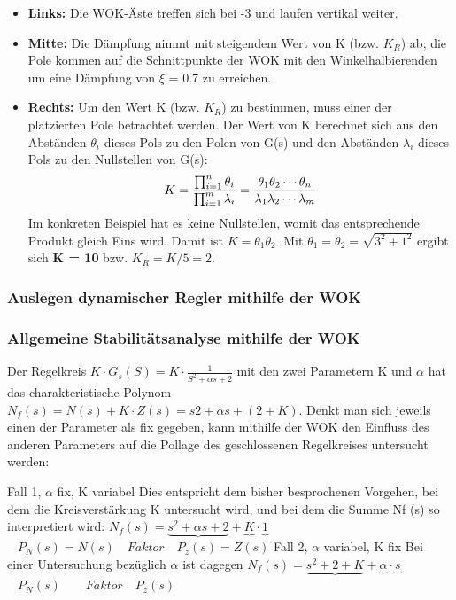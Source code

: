 \begin{multicols}{2}
    \begin{itemize}
    	\item  \textbf{Links:} Die WOK-Äste treffen sich bei -3 und laufen vertikal weiter.
    	\item  \textbf{Mitte:} Die Dämpfung nimmt mit steigendem Wert von K (bzw. $K_R$) ab; die
    	Pole kommen auf die Schnittpunkte der WOK mit den Winkelhalbierenden um eine Dämpfung von $\xi$ = 0.7 zu erreichen.
    	\item  \textbf{Rechts:} Um den Wert K (bzw. $K_R$) zu bestimmen, muss einer der platzierten	Pole betrachtet werden. Der Wert von K berechnet sich aus den Abständen $\theta_i$ dieses Pols zu den Polen von G(s) und den Abständen $\lambda_i$ dieses Pols zu den
    	Nullstellen von G(s): 
        \[
            K=\frac{\prod_{i=1}^{n} \theta_i}{\prod_{i=1}^{m}\lambda_i}=\frac{\theta_1\theta_2\cdots\theta_n}{\lambda_1\lambda_2\cdots\lambda_m} \\
        \]
        Im konkreten Beispiel hat es keine Nullstellen, womit das entsprechende Produkt
    	gleich Eins wird. 	Damit ist $K=\theta_1\theta_2$ .Mit $\theta_1=\theta_2=\sqrt{3^2+1^2}$ ergibt sich \textbf{K = 10} bzw. $K_R = K/5 = 2$.
    \end{itemize}
\end{multicols}


\subsubsection{Auslegen dynamischer Regler mithilfe der WOK }


\subsubsection{Allgemeine Stabilitätsanalyse mithilfe der WOK }
Der Regelkreis $K\cdot G_s(S)=K\cdot\frac{1}{S^2+\alpha s + 2}$ mit den zwei Parametern K und $\alpha$ hat das charakteristische
Polynom $N_f(s)=N(s) + K\cdot Z(s) = s2 + \alpha s + (2 + K)$. Denkt man sich jeweils einen der
Parameter als fix gegeben, kann mithilfe der WOK den Einfluss des anderen Parameters
auf die Pollage des geschlossenen Regelkreises untersucht werden:

Fall 1, $\alpha$ fix, K variabel
Dies entspricht dem bisher besprochenen Vorgehen, bei dem die Kreisverstärkung
K untersucht wird, und bei dem die Summe Nf (s) so interpretiert wird:
$N_f(s)=\underbrace{s^2+\alpha s + 2} +\underbrace{K}\cdot\underbrace{1} $\\
\textcolor{white}{x} \hspace{12.25cm} $P_N(s)=N(s) \quad Faktor  \quad P_z(s)=Z(s)$
Fall 2, $\alpha$ variabel, K fix Bei einer Untersuchung bezüglich $\alpha$ ist dagegen
$N_f(s)=\underbrace{s^2+ 2 + K} +\underbrace{\alpha}\cdot\underbrace{s} $\\
\textcolor{white}{x} \hspace{13.5cm} $P_N(s) \qquad Faktor  \quad P_z(s)$
